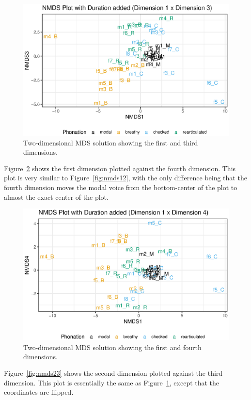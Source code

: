 \begin{figure}[!h]
    \centering
    \includegraphics[width = 0.75\linewidth]{images/MDS/nmds13_dur.eps}
    \caption{Two-dimensional MDS solution showing the first and third dimensions.}
    \label{fig:nmds13}
\end{figure}

Figure~\ref{fig:nmds14} shows the first dimension plotted against the fourth dimension. This plot is very similar to Figure~\ref{fig:nmds12}, with the only difference being that the fourth dimension moves the modal voice from the bottom-center of the plot to almost the exact center of the plot.

\begin{figure}[h!]
    \centering
    \includegraphics[width = 0.75\linewidth]{images/MDS/nmds14_dur.eps}
    \caption{Two-dimensional MDS solution showing the first and fourth dimensions.}
    \label{fig:nmds14}
\end{figure}

Figure~\ref{fig:nmds23} shows the second dimension plotted against the third dimension. This plot is essentially the same as Figure~\ref{fig:nmds13}, except that the coordinates are flipped.

